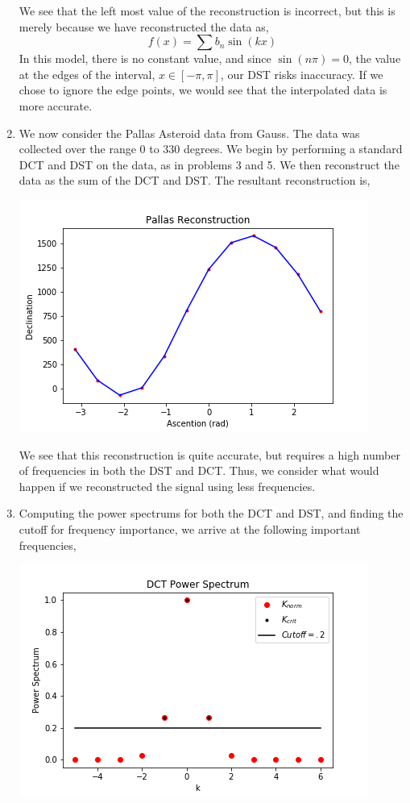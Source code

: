\documentclass[letterpaper,10pt]{article}
\begin{document}
\begin{enumerate}
\begin{center}
\end{center}
We see that the left most value of the reconstruction is incorrect, but this is merely because we have reconstructed the data as,
\[f(x)=\sum b_n\sin(kx)\]
In this model, there is no constant value, and since $\sin(n\pi)=0$, the value at the edges of the interval, $x\in[-\pi,\pi]$, our DST risks inaccuracy. If we chose to ignore the edge points, we would see that the interpolated data is more accurate.
\item We now consider the Pallas Asteroid data from Gauss. The data was collected over the range $0$ to $330$ degrees. We begin by performing a standard DCT and DST on the data, as in problems 3 and 5. We then reconstruct the data as the sum of the DCT and DST. The resultant reconstruction is,
\begin{center}
\includegraphics[scale=.75]{6.png}
\end{center}
We see that this reconstruction is quite accurate, but requires a high number of frequencies in both the DST and DCT. Thus, we consider what would happen if we reconstructed the signal using less frequencies.
\item Computing the power spectrums for both the DCT and DST, and finding the cutoff for frequency importance, we arrive at the following important frequencies,
\begin{center}
\includegraphics[scale=.5]{7a.png}

\end{center}
\end{enumerate}
\end{document}
